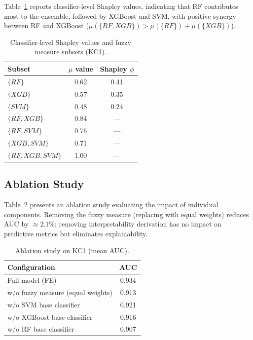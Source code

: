 \documentclass[10pt,twocolumn]{article}
\begin{document}
Table~\ref{tab:shapley_classifiers} reports classifier-level Shapley values, indicating
that RF contributes most to the ensemble, followed by XGBoost and SVM, with positive
synergy between RF and XGBoost ($\mu(\{RF, XGB\}) > \mu(\{RF\}) + \mu(\{XGB\})$).

\begin{table}[H]
  \centering
  \caption{Classifier-level Shapley values and fuzzy measure subsets (KC1).}
  \label{tab:shapley_classifiers}
  \small
  \begin{tabular}{lcc}
    \toprule
    \textbf{Subset} & \textbf{$\mu$ value} & \textbf{Shapley $\phi$} \\
    \midrule
    $\{RF\}$          & 0.62 & 0.41 \\
    $\{XGB\}$         & 0.57 & 0.35 \\
    $\{SVM\}$         & 0.48 & 0.24 \\
    $\{RF, XGB\}$     & 0.84 & ---  \\
    $\{RF, SVM\}$     & 0.76 & ---  \\
    $\{XGB, SVM\}$    & 0.71 & ---  \\
    $\{RF,XGB,SVM\}$  & 1.00 & ---  \\
    \bottomrule
  \end{tabular}
\end{table}

\subsection{Ablation Study}

Table~\ref{tab:ablation} presents an ablation study evaluating the impact of individual
components. Removing the fuzzy measure (replacing with equal weights) reduces AUC by
$\approx 2.1\%$; removing interpretability derivation has no impact on predictive metrics
but eliminates explainability.

\begin{table}[H]
  \centering
  \caption{Ablation study on KC1 (mean AUC).}
  \label{tab:ablation}
  \small
  \begin{tabular}{lc}
    \toprule
    \textbf{Configuration} & \textbf{AUC} \\
    \midrule
    Full model (FE)                   & 0.934 \\
    w/o fuzzy measure (equal weights) & 0.913 \\
    w/o SVM base classifier           & 0.921 \\
    w/o XGBoost base classifier       & 0.916 \\
    w/o RF base classifier            & 0.907 \\
    \bottomrule
  \end{tabular}
\end{table}
\end{document}
